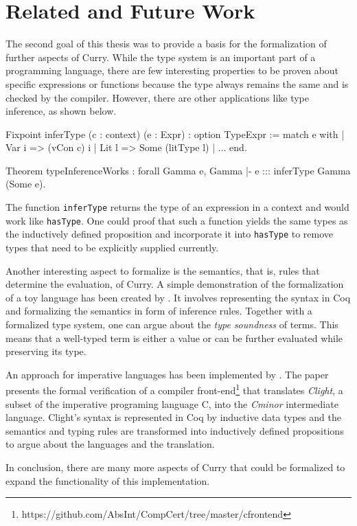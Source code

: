 \documentclass[paper = a4, fleqn, twoside]{scrreprt}
\begin{document}
\section{Related and Future Work}
The second goal of this thesis was to provide a basis for the formalization of further aspects of Curry. While the type system is an important part of a programming language, there are few interesting properties to be proven about specific expressions or functions because the type always remains the same and is checked by the compiler. However, there are other applications like type inference, as shown below.
\begin{coqcode}
Fixpoint inferType (c : context) (e : Expr) : option TypeExpr :=
  match e with
  | Var i => (vCon c) i
  | Lit l => Some (litType l)
  | ...
  end.
  
Theorem typeInferenceWorks : forall Gamma e, Gamma |- e ::: inferType Gamma (Some e).
\end{coqcode}
The function \texttt{inferType} returns the type of an expression in a context and would work like \texttt{hasType}. One could proof that such a function yields the same types as the inductively defined proposition and incorporate it into \texttt{hasType} to remove types that need to be explicitly supplied currently.\\
\par \noindent
Another interesting aspect to formalize is the semantics, that is, rules that determine the evaluation, of Curry. A simple demonstration of the formalization of a toy language has been created by \citet{Pierce:SF}. It involves representing the syntax in Coq and formalizing the semantics in form of inference rules. Together with a formalized type system, one can argue about the \textit{type soundness} of terms. This means that a well-typed term is either a value or can be further evaluated while preserving its type.\\
\par \noindent
An approach for imperative languages has been implemented by \citet{2006-Leroy-Blazy-Dargaye}. The paper presents the formal verification of a compiler front-end\footnote{https://github.com/AbsInt/CompCert/tree/master/cfrontend} that translates \textit{Clight}, a subset of the imperative programing language C, into the \textit{Cminor} intermediate language. Clight's syntax is represented in Coq by inductive data types and the semantics and typing rules are transformed into inductively defined propositions to argue about the languages and the translation.\\
\par \noindent
In conclusion, there are many more aspects of Curry that could be formalized to expand the functionality of this implementation. 
\appendix
\end{document}
